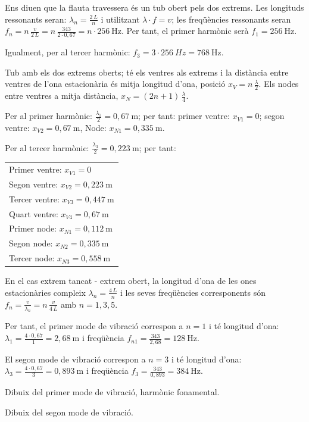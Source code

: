 \begin{solapartat}
 Ens diuen que la flauta travessera és un tub obert pels dos extrems. Les longituds ressonants seran: $\lambda_n = \frac{2\,L}{n}$ i utilitzant $\lambda\cdot f = v$; les freqüències ressonants seran $f_n = n\,\frac{v}{2\,L} = n\,\frac{343}{2\cdot 0,67} = n\cdot 256\ \mathrm{Hz}$. Per tant, el primer harmònic serà $f_1 = 256\ \mathrm{Hz}$.

 Igualment, per al tercer harmònic: $f_3 = 3\cdot 256\ Hz = 768\ \mathrm{Hz}$.

 Tub amb els dos extrems oberts; té els ventres als extrems i la distància entre ventres de l'ona estacionària és mitja longitud d'ona, posició $x_V = n\,\frac{\lambda}{2}$. Els nodes entre ventres a mitja distància, $x_N = (2n+1)\,\frac{\lambda}{4}$.

 Per al primer harmònic: $\frac{\lambda_1}{2} = 0,67\ \mathrm{m}$; per tant: primer ventre: $x_{V1} = 0$; segon ventre: $x_{V2} = 0,67\ \mathrm{m}$, Node: $x_{N1} = 0,335\ \mathrm{m}$.

 Per al tercer harmònic: $\frac{\lambda_3}{2} = 0,223\ \mathrm{m}$; per tant:

\begin{tabular}{@{}l}
Primer ventre: $x_{V1} = 0$\\
Segon ventre: $x_{V2} = 0,223\ \mathrm{m}$\\
Tercer ventre: $x_{V3} = 0,447\ \mathrm{m}$\\
Quart ventre: $x_{V4} = 0,67\ \mathrm{m}$\\
Primer node: $x_{N1} = 0,112\ \mathrm{m}$\\
Segon node: $x_{N2} = 0,335\ \mathrm{m}$\\
Tercer node: $x_{N3} = 0,558\ \mathrm{m}$
\end{tabular}

\end{solapartat}

\begin{solapartat}
 En el cas extrem tancat - extrem obert, la longitud d'ona de les ones estacionàries compleix $\lambda_n = \frac{4\,L}{n}$ i les seves freqüències corresponents són $f_n = \frac{v}{\lambda_n} = n\,\frac{v}{4\,L}$ amb $n = 1, 3, 5$.

Per tant, el primer mode de vibració correspon a $n = 1$ i té longitud d'ona: $\lambda_1 = \frac{4\cdot 0,67}{1} = 2,68\ \mathrm{m}$ i freqüència $f_{n1} = \frac{343}{2,68} = 128\ \mathrm{Hz}$.

 El segon mode de vibració correspon a $n = 3$ i té longitud d'ona: $\lambda_3 = \frac{4\cdot 0,67}{3} = 0,893\ \mathrm{m}$ i freqüència $f_3 = \frac{343}{0,893} = 384\ \mathrm{Hz}$.

 Dibuix del primer mode de vibració, harmònic fonamental.

 Dibuix del segon mode de vibració.

\end{solapartat}
